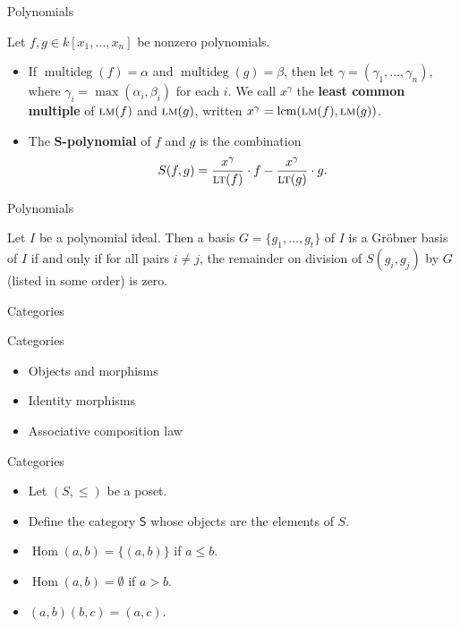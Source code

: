 \documentclass{beamer}
\DeclareMathOperator{\Hom}{Hom}
\DeclareMathOperator{\lcm}{lcm}
\newcommand{\LT}{\ensuremath{\text{\sc lt}}}
\newcommand{\LM}{\ensuremath{\text{\sc lm}}}
\DeclareMathOperator{\multideg}{multideg}
\begin{document}
\begin{frame}{Polynomials}
  \begin{definition}
    Let $f,g \in k[x_1,\dots,x_n]$ be nonzero polynomials.
    \begin{itemize}
      \item<2-> If $\multideg(f) = \alpha$ and $\multideg(g) = \beta$, then let $\gamma  =(\gamma_1,\dots,\gamma_n)$, where $\gamma_i = \max(\alpha_i,\beta_i)$ for each $i$. We call $x^\gamma$ the \textbf{least common multiple} of $\LM(f)$ and $\LM(g)$, written $x^\gamma = \lcm(\LM(f),\LM(g))$.
      \item<3-> The \textbf{$\mathbf S$-polynomial} of $f$ and $g$ is the combination
      \[ S(f,g) = \frac{x^\gamma}{\LT(f)} \cdot f - \frac{x^\gamma}{\LT(g)} \cdot g. \]
    \end{itemize}
  \end{definition}
\end{frame}

\begin{frame}{Polynomials}
  \begin{theorem}
    Let $I$ be a polynomial ideal. Then a basis $G = \{g_1,\dots,g_t\}$ of $I$ is a Gr\"obner basis of $I$ if and only if for all pairs $i \ne j$, the remainder on division of $S(g_i,g_j)$ by $G$ (listed in some order) is zero.
  \end{theorem}
\end{frame}

\begin{frame}{Categories}
\end{frame}

\begin{frame}{Categories}
  \begin{itemize}
    \item Objects and morphisms
    \item<2-> Identity morphisms
    \item<3-> Associative composition law
  \end{itemize}
\end{frame}

\begin{frame}{Categories}
  \begin{itemize}
    \item Let $(S,\le)$ be a poset.
    \item<2-> Define the category $\mathsf S$ whose objects are the elements of $S$.
    \item<3-> $\Hom(a,b) = \{(a,b)\}$ if $a \le b$.
    \item<4-> $\Hom(a,b) = \emptyset$ if $a > b$.
    \item<5-> $(a,b)(b,c)=(a,c)$.
  \end{itemize}
\end{frame}
\end{document}
